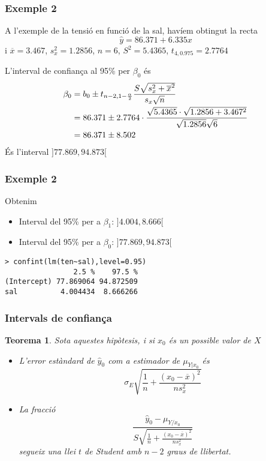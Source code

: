 \documentclass[12pt,t]{beamer}
\theoremstyle{plain}
\newtheorem{teorema}{Teorema}
\theoremstyle{definition}
\begin{document}
\begin{frame}
\frametitle{Exemple 2}
\vspace*{-2ex}

A l'exemple de la tensió en funció de la sal, havíem obtingut la recta
$$
\widehat{y}=86.371+6.335x
$$
i $\overline{x}=3.467$, $s_x^2=1.2856$, $n=6$, $S^2=5.4365$, $t_{4,0.975}=2.7764$
\medskip

L'interval de confiança al 95\% per $\beta_0$ és\pause
$$
\begin{array}{l}
\displaystyle \beta_0=b_0\pm t_{n-2,1-\frac{\alpha}{2}}\frac{S\sqrt{s_x^2+\overline{x}^2}}{s_x\sqrt{n}}
\\[2ex]
\displaystyle\hphantom{\beta_0}=86.371\pm 2.7764\cdot \frac{\sqrt{5.4365}\cdot\sqrt{1.2856+3.467^2}}{\sqrt{1.2856}\sqrt{6}}\\[2ex]
\hphantom{\beta_0} =86.371\pm 8.502
\end{array}
$$
És l'interval $]77.869, 94.873[$

\end{frame}


\begin{frame}[fragile]
\frametitle{Exemple 2}
\vspace*{-2ex}

Obtenim
\begin{itemize}
\item Interval del 95\% per a $\beta_1$:  $]4.004,8.666[$
\medskip

\item Interval del 95\% per a $\beta_0$:   $]77.869, 94.873[$
\end{itemize}
\begin{verbatim}
> confint(lm(ten~sal),level=0.95)
                2.5 %    97.5 %
(Intercept) 77.869064 94.872509
sal          4.004434  8.666266
\end{verbatim}

\end{frame}



\begin{frame}
\frametitle{Intervals de confiança}
\begin{teorema}
Sota aquestes hipòtesis, i si $x_0$ és un possible valor de $X$
\begin{itemize}
\item L'error estàndard de $\widehat{y}_0$ com a estimador de $\mu_{Y|x_0}$ és
$$
\sigma_E\sqrt{\frac{1}{n}+\frac{(x_0-\overline{x})^2}{ns^2_x}}
$$

\item La fracció
$$
\frac{\widehat{y}_0-\mu_{Y/x_0}}{S\sqrt{\frac{1}{n}+\frac{(x_0-\overline{x})^2}{n
s^2_x}}}$$
segueix una llei $t$ de Student amb $n-2$ graus de llibertat.
\end{itemize}
\end{teorema}
\end{frame}
\end{document}
